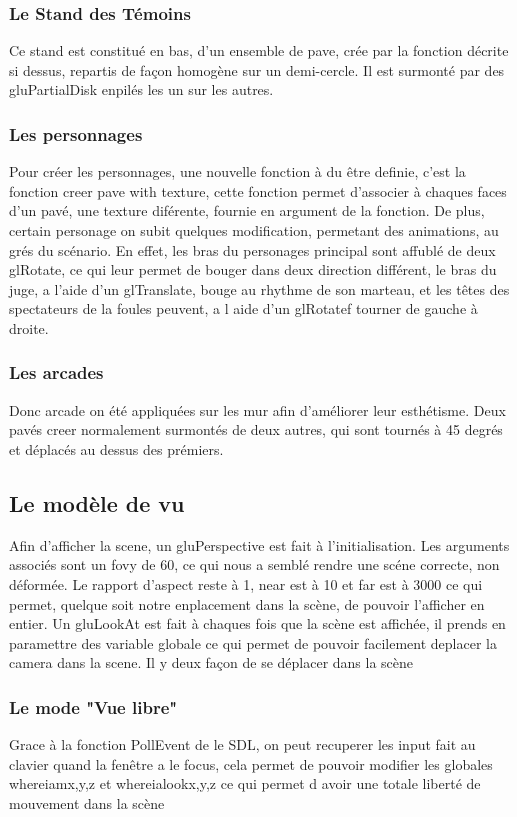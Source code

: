 	\subsubsection{Le Stand des Témoins}
	Ce stand est constitué en bas, d'un ensemble de pave, crée par la fonction décrite si dessus, repartis de façon homogène sur un demi-cercle. Il est surmonté par des gluPartialDisk enpilés les un sur les autres.
	\subsubsection{Les personnages}
	Pour créer les personnages, une nouvelle fonction à du être definie, c'est la fonction creer pave with texture, cette fonction permet d'associer à chaques faces d'un pavé, une texture diférente, fournie en argument de la fonction. De plus, certain personage on subit quelques modification, permetant des animations, au grés du scénario.
	En effet, les bras du personages principal sont affublé de deux glRotate, ce qui leur permet de bouger dans deux direction différent, le bras du juge, a l'aide d'un glTranslate, bouge au rhythme de son marteau, et les têtes des spectateurs de la foules peuvent, a l aide d'un glRotatef tourner de gauche à droite.
	\subsubsection{Les arcades}
	Donc arcade on été appliquées sur les mur afin d'améliorer leur esthétisme. Deux pavés creer normalement surmontés de deux autres, qui sont tournés à 45 degrés et déplacés au dessus des prémiers.
\subsection{Le modèle de vu}
	Afin d'afficher la scene, un gluPerspective est fait à l'initialisation. Les arguments associés sont un fovy de 60, ce qui nous a semblé rendre une scéne correcte, non déformée. Le rapport d'aspect reste à 1, near est à 10 et far est à 3000 ce qui permet, quelque soit notre enplacement dans la scène, de pouvoir l'afficher en entier.\newline
	Un gluLookAt est fait à chaques fois que la scène est affichée, il prends en paramettre des variable globale ce qui permet de pouvoir facilement deplacer la camera dans la scene. Il y deux façon de se déplacer dans la scène
	\subsubsection{Le mode "Vue libre"}
	Grace à la fonction PollEvent de le SDL, on peut recuperer les input fait au clavier quand la fenêtre a le focus, cela permet de pouvoir modifier les globales whereiam{x,y,z} et whereialook{x,y,z} ce qui permet d avoir une totale liberté de mouvement dans la scène
